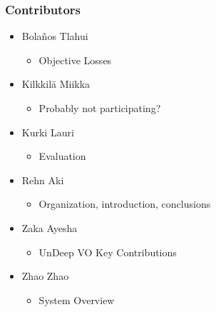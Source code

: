 \begin{frame}
    \frametitle{Contributors}
    \begin{itemize}
        \item Bola\~nos Tlahui
            \begin{itemize}
                \item Objective Losses
            \end{itemize}
        \item Kilkkilä Miikka
            \begin{itemize}
                \item Probably not participating?
            \end{itemize}
        \item Kurki Lauri
            \begin{itemize}
                \item Evaluation
            \end{itemize}
        \item Rehn Aki
            \begin{itemize}
                \item Organization, introduction, conclusions
            \end{itemize}
        \item Zaka Ayesha
            \begin{itemize}
                \item UnDeep VO Key Contributions
            \end{itemize}
        \item Zhao Zhao
            \begin{itemize}
                \item System Overview
            \end{itemize}
    \end{itemize}
\end{frame}
